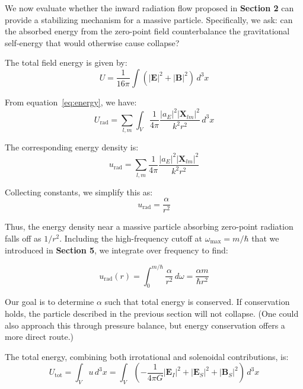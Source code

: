 \documentclass {article}
\renewcommand\vec{\mathbf}
\begin{document}
We now evaluate whether the inward radiation flow proposed in \textbf{Section 2} can provide a stabilizing mechanism for a massive particle. Specifically, we ask: can the absorbed energy from the zero-point field counterbalance the gravitational self-energy that would otherwise cause collapse?

The total field energy is given by:
\begin{equation}
U = \frac{1}{16\pi} \int \left( |\vec{E}|^2 + |\vec{B}|^2 \right) \, d^3x
\end{equation}

From equation~\eqref{eq:energy}, we have:
\begin{equation}
U_{\text{rad}} = \sum_{l, m} \int_V \frac{1}{4\pi} \frac{|a_E|^2 |\vec{X}_{lm}|^2}{k^2 r^2} \, d^3x
\end{equation}

The corresponding energy density is:
\begin{equation}
u_{\text{rad}} = \sum_{l, m} \frac{1}{4\pi} \frac{|a_E|^2 |\vec{X}_{lm}|^2}{k^2 r^2}
\end{equation}

Collecting constants, we simplify this as:
\begin{equation}
u_{\text{rad}} = \frac{\alpha}{r^2}
\end{equation}

Thus, the energy density near a massive particle absorbing zero-point radiation falls off as \(1/r^2\). Including the high-frequency cutoff at \(\omega_{\text{max}} = m/\hbar\) that we introduced in \textbf{Section 5}, we integrate over frequency to find:

\begin{equation}
u_{\text{rad}}(r) = \int_0^{m/\hbar} \frac{\alpha}{r^2} \, d\omega = \frac{\alpha m}{\hbar r^2}
\end{equation}

Our goal is to determine \(\alpha\) such that total energy is conserved. If conservation holds, the particle described in the previous section will not collapse. (One could also approach this through pressure balance, but energy conservation offers a more direct route.)

The total energy, combining both irrotational and solenoidal contributions, is:
\begin{equation}
U_{\text{tot}} = \int_V u \, d^3x = \int_V \left( -\frac{1}{4\pi G} |\vec{E}_I|^2 + |\vec{E}_S|^2 + |\vec{B}_S|^2 \right) \, d^3x
\end{equation}
\end{document}
